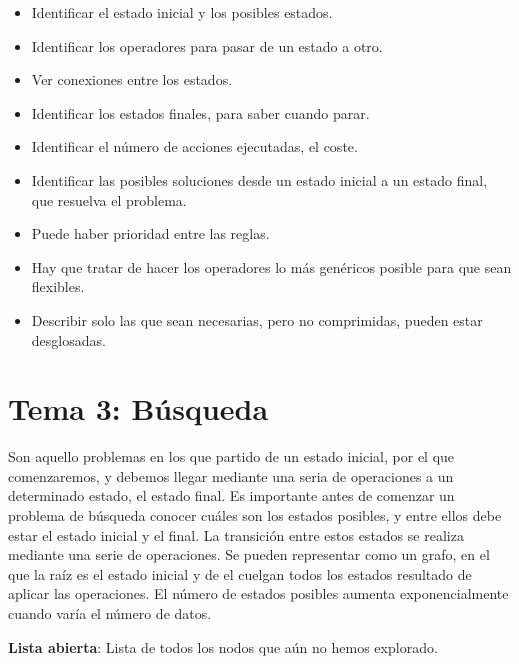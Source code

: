 \documentclass[12pt, twoside, openright]{report} %
\begin{document}
  \begin{itemize}
  \item Identificar el estado inicial y los posibles estados.
    
  \item Identificar los operadores para pasar de un estado a otro.
    
  \item Ver conexiones entre los estados.
    
  \item Identificar los estados finales, para saber cuando parar.
    
  \item Identificar el número de acciones ejecutadas, el coste.
    
  \item Identificar las posibles soluciones desde un estado inicial a un
    estado final, que resuelva el problema.
    
  \item Puede haber prioridad entre las reglas.
    
  \item Hay que tratar de hacer los operadores lo más genéricos posible para
    que sean flexibles.
    
  \item Describir solo las que sean necesarias, pero no comprimidas, pueden
    estar desglosadas.
    
  \end{itemize}


\chapter{Tema 3: Búsqueda}


  Son aquello problemas en los que partido de un estado inicial, por el
  que comenzaremos, y debemos llegar mediante una seria de operaciones a
  un determinado estado, el estado final. Es importante antes de
  comenzar un problema de búsqueda conocer cuáles son los estados
  posibles, y entre ellos debe estar el estado inicial y el final. La
  transición entre estos estados se realiza mediante una serie de
  operaciones. Se pueden representar como un grafo, en el que la raíz es
  el estado inicial y de el cuelgan todos los estados resultado de
  aplicar las operaciones. El número de estados posibles aumenta
  exponencialmente cuando varía el número de datos.

  \textbf{Lista abierta}: Lista de todos los nodos que aún no hemos
  explorado.
\end{document}
